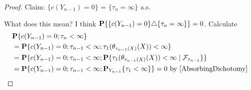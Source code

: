 \begin{proof}
Claim: $\lbrace c(Y_{n-1}) = 0 \rbrace$ = $\lbrace \tau_n = \infty
\rbrace$ a.s.

What does this mean?  I think $\probability{\lbrace c(Y_{n-1}) = 0
  \rbrace \triangle \lbrace \tau_n = \infty\rbrace} = 0$.
Calculate
\begin{align*}
&\probability{c(Y_{n-1}) = 0; \tau_n < \infty} \\
&=
\probability{c(Y_{n-1}) = 0; \tau_{n-1} < \infty;
  \tau_1(\theta_{\tau_{n-1}(X)}(X)) < \infty } \\
&= \probability{c(Y_{n-1}) = 0; \tau_{n-1} < \infty;
  \cprobability{\mathcal{F}_{\tau_{n-1}}}{\tau_1(\theta_{\tau_{n-1}(X)}(X)) < \infty }} \\
&= \probability{c(Y_{n-1}) = 0; \tau_{n-1} < \infty;
  \sprobability{\tau_1 < \infty }{Y_{n-1}}} = 0 \text{ by \eqref{AbsorbingDichotomy}}\\
\end{align*}
\end{proof}
